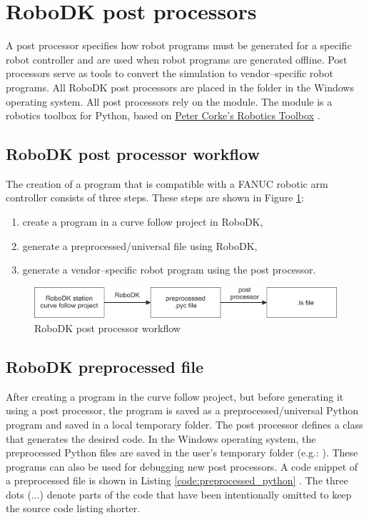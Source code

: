\section{RoboDK post processors}

A post processor specifies how robot programs must be generated for a specific robot controller and are used when robot programs are generated offline. Post processors serve as tools to convert the simulation to vendor--specific robot programs. All RoboDK post processors are placed in the  folder in the Windows operating system. All post processors rely on the  module. The  module is a robotics toolbox for Python, based on \href{http://petercorke.com/Robotics_Toolbox.html}{Peter Corke’s Robotics Toolbox} \cite{robodkapipython}. 

\subsection{RoboDK post processor workflow}

The creation of a program that is compatible with a FANUC robotic arm controller consists of three steps. These steps are shown in Figure \ref{workflow}:

\begin{enumerate}
  \item create a program in a curve follow project in RoboDK,   
  \item generate a preprocessed/universal  file using RoboDK,
  \item generate a vendor--specific robot  program using the post processor.
\end{enumerate}


\begin{figure}[h]
    \centering
    \includegraphics[width=0.9\linewidth]{img/workflow.jpg}
    \caption{RoboDK post processor workflow}
    \label{workflow}
\end{figure}


\subsection{RoboDK preprocessed file}

After creating a program in the curve follow project, but before generating it using a post processor, the program is saved as a preprocessed/universal Python program and saved in a local temporary folder. The post processor defines a  class that generates the desired code. In the Windows operating system, the preprocessed Python files are saved in the user's temporary folder (e.g.: ). These programs can also be used for debugging new post processors. A code snippet of a preprocessed file is shown in Listing \ref{code:preprocessed_python} \cite{preprocessed}. The three dots (...) denote parts of the code that have been intentionally omitted to keep the source code listing shorter. 




